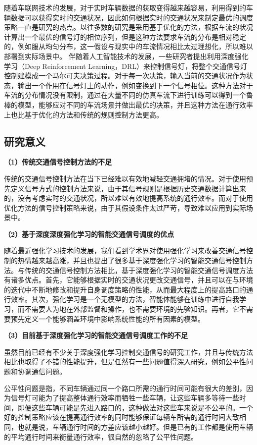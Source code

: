 随着车联网技术的发展，对于实时车辆数据的获取变得越来越容易，利用得到的车辆数据可以获得实时的交通状况，因此如何根据实时的交通状况来制定最优的调度策略一直是研究的热点。以往多数的研究是采用基于优化的方法，根据车流的状况计算出一个最优的信号灯的相位序列，但是这种方法要求车流的分布是相对稳定的，例如服从均匀分布，这一假设与现实中的车流情况相比太过理想化，所以难以部署到实际场景中。
伴随着人工智能技术的发展，一些研究者提出利用深度强化学习（Deep Reinforcement Learning，DRL）来控制信号灯，将整个交通信号灯控制建模成一个马尔可夫决策过程。对于每一次决策，输入当前的交通状况作为状态，输出一个作用在信号灯上的动作，例如变换到下一个信号相位。这种方法对于车流的分布情况没有限制，通过在大量不同的仿真车流下进行训练可以得到一个鲁棒的模型，能够应对不同的车流场景并做出最优的决策，并且这种方法在通行效率上也比基于优化的方法和传统的规则控制方法更高。

\subsection{研究意义}
\textbf{（1）传统交通信号控制方法的不足}

传统的交通信号控制方法在当下已经难以有效地减轻交通拥堵的情况。对于使用预先定义信号方式的控制方法来说，由于其信号规则是根据历史交通数据计算出来的，没有考虑实时的交通状况，所以难以有效地提高系统的通行效率。而对于使用优化方法的信号控制策略来说，由于其假设条件太过严苛，导致难以应用到实际场景中。

\textbf{（2）基于深度深度强化学习的智能交通信号调度的优点}

随着最近强化学习技术的发展，我们看到学术界对使用强化学习来改善交通信号控制的热情越来越高涨，并且也提出了很多基于深度强化学习的智能交通信号控制方法。与传统的交通信号控制方法相比，基于深度强化学习的智能交通信号调度方法有诸多优点。首先，它能够根据实时的交通状况更改交通信号，并且可以在与环境的迭代中不断地修改和提升自身调度策略的性能，从而最大程度上的提高路口的通行效率。其次，强化学习是一个无模型的方法，智能体能够在训练中进行自我学习，而不需要人为地在外部监督和操作，也不需要环境的先验知识。再者，它不需要预先定义一个能够涵盖环境中影响系统性能的所有因素的模型。

\textbf{（3）目前基于深度强化学习的智能交通信号调度工作的不足}

虽然目前已经有不少关于深度强化学习控制交通信号的研究工作，并且与传统方法相比也取得了不错的性能提升，但是任然有一些问题值得深入研究，例如公平性问题和协调通信问题。

公平性问题是指，不同车辆通过同一个路口所需的通行时间可能有很大的差别，因为信号灯可能为了提高整体通行效率而牺牲一些车辆，让这些车辆多等待一些时间，即便这些车辆可能是先进入路口的，这种做法对这些车来说是不公平的。一个好的控制策略应该在提高通行效率的同时能够保证每辆车所需的通行时间大致相同，也就是说，车辆通行时间的方差应该越小越好。但是已有的工作都是使用车辆的平均通行时间来衡量通行效率，很自然的忽略了公平性问题。


